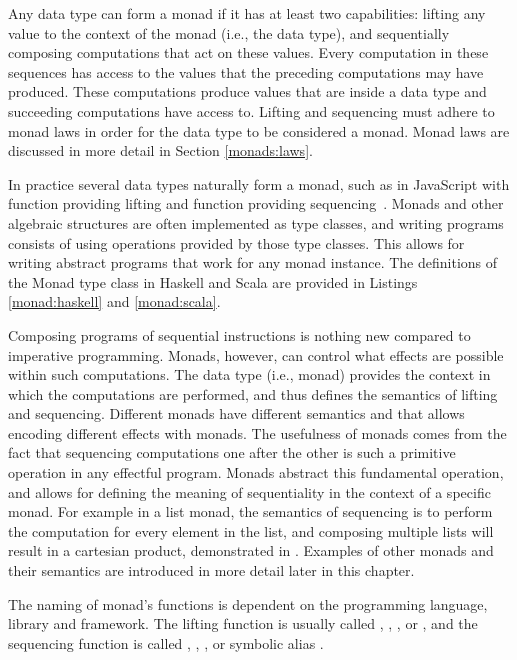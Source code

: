 Any data type can form a monad if it has at least two capabilities: lifting any value to the context of the monad (i.e., the data type), and sequentially composing computations that act on these values. Every computation in these sequences has access to the values that the preceding computations may have produced. These computations produce values that are inside a data type and succeeding computations have access to. Lifting and sequencing must adhere to monad laws in order for the data type to be considered a monad. Monad laws are discussed in more detail in Section \ref{monads:laws}.

In practice several data types naturally form a monad, such as  in JavaScript with  function providing lifting and  function providing sequencing~\cite{js-array}. Monads and other algebraic structures are often implemented as type classes, and writing programs consists of using operations provided by those type classes. This allows for writing abstract programs that work for any monad instance. The definitions of the Monad type class in Haskell and Scala are provided in Listings \ref{monad:haskell} and \ref{monad:scala}.





Composing programs of sequential instructions is nothing new compared to imperative programming. Monads, however, can control what effects are possible within such computations. The data type (i.e., monad) provides the context in which the computations are performed, and thus defines the semantics of lifting and sequencing. Different monads have different semantics and that allows encoding different effects with monads. The usefulness of monads comes from the fact that sequencing computations one after the other is such a primitive operation in any effectful program. Monads abstract this fundamental operation, and allows for defining the meaning of sequentiality in the context of a specific monad. For example in a list monad, the semantics of sequencing is to perform the computation for every element in the list, and composing multiple lists will result in a cartesian product, demonstrated in . Examples of other monads and their semantics are introduced in more detail later in this chapter.



The naming of monad's functions is dependent on the programming language, library and framework. The lifting function is usually called , , , or , and the sequencing function is called , , , or symbolic alias \inlinecode{>>=}.

